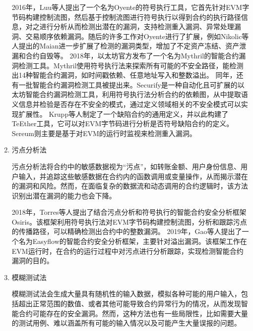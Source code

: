\begin{enumerate}[label=\Alph*., align=left, leftmargin=*]
    2016年，Luu等人提出了一个名为Oyente\cite{luu2016making}的符号执行工具，它首先针对EVM字节码构建控制流图，然后基于控制流图进行符号执行以得到合约的执行路径信息，对之进行分析从而检测出潜在的漏洞，支持检测重入漏洞、异常处理漏洞、交易顺序依赖漏洞。随后的许多工作对Oyente进行了扩展，例如Nikolic等人提出的Maian\cite{maian}进一步扩展了检测的漏洞类型，增加了不定资产冻结、资产泄漏和合约自毁等。
    2018年，以太坊官方发布了一个名为Mythril\cite{mythril}的智能合约漏洞检测工具。Mythril使用符号执行法来探索所有可能的不安全路径，能检测出14种智能合约漏洞，如时间戳依赖、任意地址写入和整数溢出。
    同年，还有一批智能合约漏洞检测工具被提出来。Securify\cite{tsankov2018securify}是一种自动化且可扩展的以太坊智能合约漏洞检测工具，利用符号执行法分析合约的依赖图，从中提取语义信息并检验是否存在不安全的模式，通过定义领域相关的不安全模式可以实现扩展性。
    Krupp等人制定了一个缺陷合约的通用定义，并以此构建了TeEther\cite{krupp2018teether}工具，它可以对EVM字节码进行分析是否符号缺陷合约的定义。Sereum\cite{rodler2018sereum}则主要是基于对EVM的运行时监视来检测重入漏洞。
    \item 污点分析法
    
    污点分析法将合约中的敏感数据视为“污点”，如转账金额、用户身份信息、用户输入，并追踪这些敏感数据在合约内的函数调用或变量操作，从而揭示潜在的漏洞和风险。然而，在面临复杂的数据流和动态调用的合约逻辑时，该方法识别出潜在漏洞的能力也会下降。
    
    2018年，Torres等人提出了结合污点分析和符号执行的智能合约安全分析框架Osiris\cite{torres2018osiris}。该框架利用符号执行法对EVM字节码构建控制流图，分析和跟踪污点的传播路径，可以精确检测出合约中的整数漏洞。
    2019年，Gao等人提出了一个名为Easyflow\cite{gao2019easyflow}的智能合约安全分析框架，主要针对溢出漏洞。该框架工作在EVM运行时，在合约的运行过程中对污点进行分析跟踪，实现检测智能合约漏洞的目的。
    \item 模糊测试法
    
    模糊测试法会生成大量具有随机性的输入数据，模拟各种可能的用户输入，包括超出正常范围的数值、或者其他可能导致合约异常行为的情况，从而发现智能合约可能存在的安全漏洞。然而，这种方法也有一些局限性，比如需要大量的测试用例、难以涵盖所有可能的输入情况以及可能产生大量误报的问题。
    

\end{enumerate}

